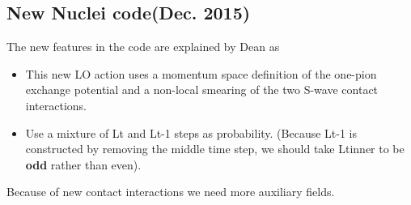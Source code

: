 \documentclass[10pt]{book}
\begin{document}
\subsection{ New Nuclei code(Dec. 2015)}
The new features in the code are explained by Dean as
\begin{itemize}
\item This new LO action uses a momentum space definition of the one-pion exchange potential 
and a non-local smearing of the two S-wave contact interactions.
\item Use a mixture of Lt and Lt-1 steps as probability. 
      (Because Lt-1 is constructed by removing the middle time step,  
      we should take Ltinner to be {\bf odd} rather than even).
\end{itemize}

Because of new contact interactions we need more auxiliary fields.
\end{document}

